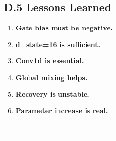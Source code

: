 \subsection{D.5 Lessons Learned}

\begin{enumerate}
\item \textbf{Gate bias must be negative.}
\item \textbf{d\_state=16 is sufficient.}
\item \textbf{Conv1d is essential.}
\item \textbf{Global mixing helps.}
\item \textbf{Recovery is unstable.}
\item \textbf{Parameter increase is real.}
\end{enumerate}
\begin{lstlisting}

---
\end{lstlisting}
